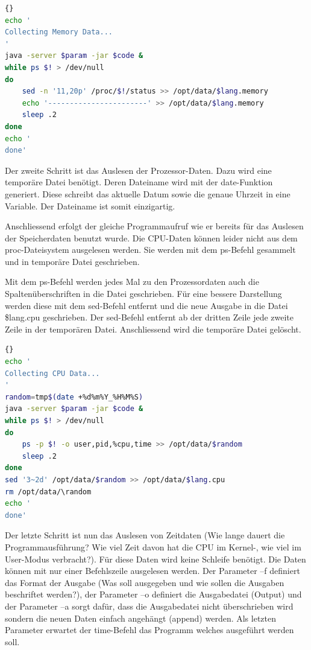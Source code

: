 \documentclass{fancydocument}
\begin{document}
\begin{minipage}{\textwidth}
\begin{lstlisting}[language=bash,caption=Speicherdaten sammeln]{}
echo '
Collecting Memory Data...
'
java -server $param -jar $code &
while ps $! > /dev/null
do
	sed -n '11,20p' /proc/$!/status >> /opt/data/$lang.memory
	echo '-----------------------' >> /opt/data/$lang.memory		
	sleep .2
done
echo '
done'
\end{lstlisting}
\end{minipage}

Der zweite Schritt ist das Auslesen der Prozessor-Daten. Dazu wird eine temporäre Datei benötigt. Deren Dateiname wird mit der date-Funktion generiert. Diese schreibt das aktuelle Datum sowie die genaue Uhrzeit in eine Variable. Der Dateiname ist somit einzigartig.

Anschliessend erfolgt der gleiche Programmaufruf wie er bereits für das Auslesen der Speicherdaten benutzt wurde. Die CPU-Daten können leider nicht aus dem proc-Dateisystem ausgelesen werden. Sie werden mit dem ps-Befehl gesammelt und in temporäre Datei geschrieben.

Mit dem ps-Befehl werden jedes Mal zu den Prozessordaten auch die Spaltenüberschriften in die Datei geschrieben. Für eine bessere Darstellung werden diese mit dem sed-Befehl entfernt und die neue Ausgabe in die Datei \$lang.cpu geschrieben. Der sed-Befehl entfernt ab der dritten Zeile jede zweite Zeile in der temporären Datei. Anschliessend wird die temporäre Datei gelöscht.

\begin{minipage}{\textwidth}
\begin{lstlisting}[language=bash,caption=CPU-Daten sammeln]{}
echo '
Collecting CPU Data...
'
random=tmp$(date +%d%m%Y_%H%M%S)
java -server $param -jar $code &	
while ps $! > /dev/null
do
	ps -p $! -o user,pid,%cpu,time >> /opt/data/$random
	sleep .2
done
sed '3~2d' /opt/data/$random >> /opt/data/$lang.cpu
rm /opt/data/\random
echo '
done'
\end{lstlisting}
\end{minipage}

Der letzte Schritt ist nun das Auslesen von Zeitdaten (Wie lange dauert die Programmausführung? Wie viel Zeit davon hat die CPU im Kernel-, wie viel im User-Modus verbracht?). Für diese Daten wird keine Schleife benötigt. Die Daten können mit nur einer Befehlszeile ausgelesen werden. Der Parameter –f definiert das Format der Ausgabe (Was soll ausgegeben und wie sollen die Ausgaben beschriftet werden?), der Parameter –o definiert die Ausgabedatei (Output) und der Parameter –a sorgt dafür, dass die Ausgabedatei nicht überschrieben wird sondern die neuen Daten einfach angehängt (append) werden. Als letzten Parameter erwartet der time-Befehl das Programm welches ausgeführt werden soll.
\end{document}
